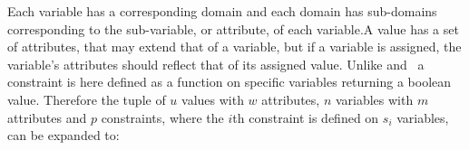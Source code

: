 Each variable has a corresponding domain and each domain has sub-domains corresponding to the sub-variable, or attribute, of each variable.A value has a set of attributes, that may extend that of a variable, but if a variable is assigned, the variable's attributes should reflect that of its assigned value\hspace{-.6em}. Unlike \cite{AIRussell} and~\cite{CPApt} a constraint is here defined as a function on specific variables returning a boolean value. Therefore the tuple of $u$ values with $w$ attributes, $n$ variables with $m$ attributes and $p$ constraints, where the $i$th constraint is defined on $s_i$ variables, can be expanded to:

